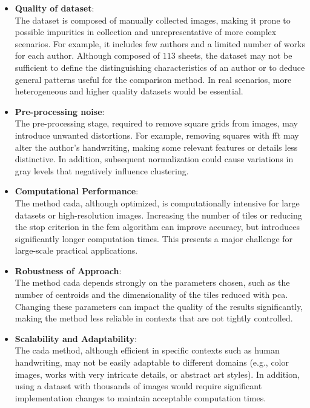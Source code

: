 \begin{toReview}
\begin{itemize}
	\item \textbf{Quality of dataset}:\\ The dataset is composed of manually collected images, making it prone to possible impurities in collection and unrepresentative of more complex scenarios. For example, it includes few authors and a limited number of works for each author. Although composed of $113$ sheets, the dataset may not be sufficient to define the distinguishing characteristics of an author or to deduce general patterns useful for the comparison method. In real scenarios, more heterogeneous and higher quality datasets would be essential.
	\item \textbf{Pre-processing noise}:\\ The pre-processing stage, required to remove square grids from images, may introduce unwanted distortions. For example, removing squares with \gls{fft} may alter the author's handwriting, making some relevant features or details less distinctive. In addition, subsequent normalization could cause variations in gray levels that negatively influence clustering.
	\item \textbf{Computational Performance}:\\ The method \gls{cada}, although optimized, is computationally intensive for large datasets or high-resolution images. Increasing the number of tiles or reducing the stop criterion in the \gls{fcm} algorithm can improve accuracy, but introduces significantly longer computation times. This presents a major challenge for large-scale practical applications.
	\item \textbf{Robustness of Approach}:\\ The method \gls{cada} depends strongly on the parameters chosen, such as the number of centroids and the dimensionality of the tiles reduced with \gls{pca}. Changing these parameters can impact the quality of the results significantly, making the method less reliable in contexts that are not tightly controlled.
	\item \textbf{Scalability and Adaptability}:\\ The \gls{cada} method, although efficient in specific contexts such as human handwriting, may not be easily adaptable to different domains (e.g., color images, works with very intricate details, or abstract art styles). In addition, using a dataset with thousands of images would require significant implementation changes to maintain acceptable computation times.
\end{itemize}


\end{toReview}
